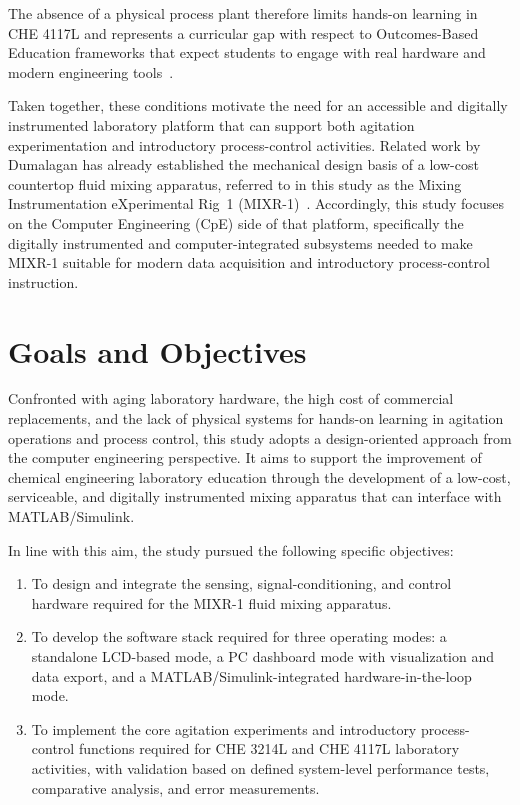 The absence of a physical process plant therefore limits hands-on learning in CHE 4117L and represents a curricular gap with respect to Outcomes-Based Education frameworks that expect students to engage with real hardware and modern engineering tools~\citep{ptcacbet2023,ched2017che}.

Taken together, these conditions motivate the need for an accessible and digitally instrumented laboratory platform that can support both agitation experimentation and introductory process-control activities. Related work by Dumalagan has already established the mechanical design basis of a low-cost countertop fluid mixing apparatus, referred to in this study as the Mixing Instrumentation eXperimental Rig~1 (MIXR-1)~\citep{dumalagan2024}. Accordingly, this study focuses on the Computer Engineering (CpE) side of that platform, specifically the digitally instrumented and computer-integrated subsystems needed to make MIXR-1 suitable for modern data acquisition and introductory process-control instruction.



\section{Goals and Objectives}  %
\label{sec:objectives}

Confronted with aging laboratory hardware, the high cost of commercial replacements, and the lack of physical systems for hands-on learning in agitation operations and process control, this study adopts a design-oriented approach from the computer engineering perspective. It aims to support the improvement of chemical engineering laboratory education through the development of a low-cost, serviceable, and digitally instrumented mixing apparatus that can interface with MATLAB/Simulink.

In line with this aim, the study pursued the following specific objectives:

\begin{enumerate}
    \item To design and integrate the sensing, signal-conditioning, and control hardware required for the MIXR-1 fluid mixing apparatus.
    \item To develop the software stack required for three operating modes: a standalone LCD-based mode, a PC dashboard mode with visualization and data export, and a MATLAB/Simulink-integrated hardware-in-the-loop mode.
    \item To implement the core agitation experiments and introductory process-control functions required for CHE 3214L and CHE 4117L laboratory activities, with validation based on defined system-level performance tests, comparative analysis, and error measurements.
\end{enumerate}

